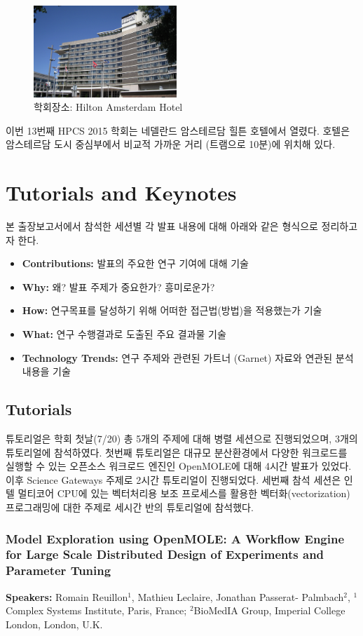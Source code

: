 \documentclass[twocolumn]{article}
\newcommand{\bi}{\begin{itemize}}
\newcommand{\ei}{\end{itemize}}
\newcommand{\ii}{\item}
\begin{document}
\begin{figure}[htb]
        \centering
        \includegraphics[width=0.48\textwidth]{hilton.png}
        \caption{학회장소: Hilton Amsterdam Hotel}
        \label{fig:hilton}
\end{figure}

이번 13번째 HPCS 2015 학회는 네델란드 암스테르담 힐튼 호텔에서 열렸다. 호텔은 암스테르담 도시 중심부에서 비교적 가까운 거리 (트램으로 10분)에 위치해 있다.

\section{Tutorials and Keynotes}
본 출장보고서에서 참석한 세션별 각 발표 내용에 대해 아래와 같은 형식으로 정리하고자 한다.
\bi
\ii \textbf{Contributions:} 발표의 주요한 연구 기여에 대해 기술
\ii \textbf{Why:} 왜? 발표 주제가 중요한가? 흥미로운가? 
\ii \textbf{How:} 연구목표를 달성하기 위해 어떠한 접근법(방법)을 적용했는가 기술
\ii \textbf{What:} 연구 수행결과로 도출된 주요 결과물 기술
\ii \textbf{Technology Trends:} 연구 주제와 관련된 가트너 (Garnet) 자료와 연관된 분석내용을 기술
\ei

\subsection{Tutorials}
튜토리얼은 학회 첫날(7/20) 총 5개의 주제에 대해 병렬 세션으로 진행되었으며, 3개의 튜토리얼에 참석하였다.
첫번째 튜토리얼은 대규모 분산환경에서 다양한 워크로드를 실행할 수 있는 오픈소스 워크로드 엔진인 OpenMOLE에 대해 4시간 발표가 있었다.
이후 Science Gateways 주제로 2시간 튜토리얼이 진행되었다. 세번째 참석 세션은 인텔 멀티코어 CPU에 있는 벡터처리용 보조 프로세스를 활용한 벡터화(vectorization) 프로그래밍에 대한 주제로 세시간 반의 튜토리얼에 참석했다.

\subsubsection{Model Exploration using OpenMOLE: A Workflow Engine for Large Scale Distributed Design of Experiments and Parameter Tuning}
\textbf{Speakers:} Romain Reuillon$^1$, Mathieu Leclaire, Jonathan Passerat- Palmbach$^2$, $^1$Complex Systems Institute, Paris, France; $^2$BioMedIA Group, Imperial College London, London, U.K.
\end{document}
